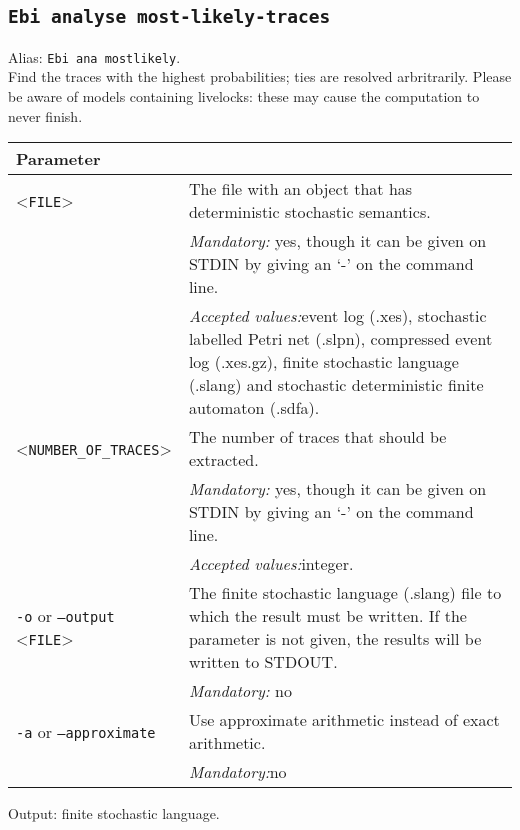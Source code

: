 {\subsection{\texttt{Ebi analyse most-likely-traces}}
\label{command:Ebi analyse most-likely-traces}
Alias: \texttt{Ebi ana mostlikely}.\\
Find the traces with the highest probabilities; ties are resolved arbritrarily.
Please be aware of models containing livelocks: these may cause the computation to never finish.\\
\begin{tabularx}{\linewidth}{lX}
\toprule
Parameter \\\midrule
<\texttt{FILE}>&The file with an object that has deterministic stochastic semantics.\\
&\textit{Mandatory:} \quad yes, though it can be given on STDIN by giving an `-' on the command line.\\
&\textit{Accepted values:}\quad event log (.xes), stochastic labelled Petri net (.slpn), compressed event log (.xes.gz), finite stochastic language (.slang) and stochastic deterministic finite automaton (.sdfa).\\
<\texttt{NUMBER\_OF\_TRACES}>&The number of traces that should be extracted.\\
&\textit{Mandatory:} \quad yes, though it can be given on STDIN by giving an `-' on the command line.\\
&\textit{Accepted values:}\quad integer.\\
\texttt{-o} or \texttt{--output} <\texttt{FILE}> &
The finite stochastic language (.slang) file to which the result must be written. If the parameter is not given, the results will be written to STDOUT.\\
&\textit{Mandatory:} \quad no\\
\texttt{-a} or \texttt{--approximate} & Use approximate arithmetic instead of exact arithmetic.\\
&\textit{Mandatory:}\quad no\\
\bottomrule
\end{tabularx}
Output: finite stochastic language.
}
